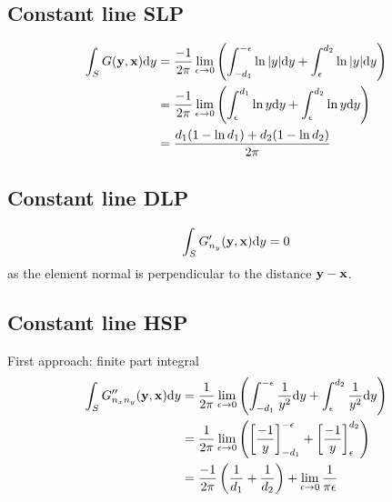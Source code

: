 \documentclass[a4paper,11pt]{article}
\newcommand{\td}{\mathrm{d}}
\begin{document}
\subsection{Constant line SLP}

\begin{align}
\int_{S} G({\bf y}, {\bf x}) \td y
& = \frac{-1}{2\pi}\lim_{\epsilon \to 0}
\left( \int_{-d_1}^{-\epsilon} \ln |y| \td y + \int_{\epsilon}^{d_2}  \ln |y| \td y \right) \nonumber \\
& = \frac{-1}{2\pi}\lim_{\epsilon \to 0}
\left( \int_{\epsilon}^{d_1} \ln y \td y + \int_{\epsilon}^{d_2}  \ln y \td y \right) \nonumber \\
&=
\frac{d_1(1-\ln d_1) + d_2(1-\ln d_2)}{2\pi}
\end{align}

\subsection{Constant line DLP}

\begin{equation}
\int_{S} G'_{n_y}({\bf y}, {\bf x}) \td y = 0
\end{equation}
%
as the element normal is perpendicular to the distance ${\bf y}-{\bf x}$.

\subsection{Constant line HSP}

First approach: finite part integral
%
\begin{align}
\int_{S} G''_{n_x n_y}({\bf y}, {\bf x}) \td y
&= \frac{1}{2\pi} \lim_{\epsilon \to 0} \left(\int_{-d_1}^{-\epsilon} \frac{1}{y^2}\td y + \int_{\epsilon}^{d_2} \frac{1}{y^2} \td y\right) \nonumber \\
&= \frac{1}{2\pi} \lim_{\epsilon \to 0} \left(\left[\frac{-1}{y}\right]_{-d_1}^{-\epsilon} +  \left[\frac{-1}{y}\right]_{\epsilon}^{d_2} \right)
\nonumber \\
&= \frac{-1}{2\pi} \left(\frac{1}{d_1} +  \frac{1}{d_2} \right) + \lim_{\epsilon \to 0} \frac{1}{\pi\epsilon}
\end{align}
\end{document}
